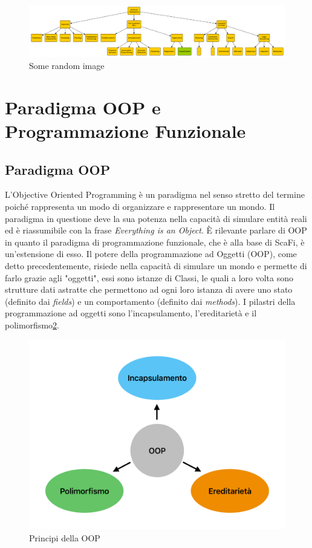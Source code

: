 \documentclass[12pt,a4paper,openright,twoside]{book}
\begin{document}

\begin{figure}
    \centering
    \includegraphics[width=.8\linewidth]{figures/random-image.pdf}
    \caption{Some random image}
    \label{fig:random-image}
\end{figure}

\section{Paradigma OOP e Programmazione Funzionale}

\subsection{Paradigma OOP}

L'Objective Oriented Programming è un paradigma nel senso stretto del termine poiché rappresenta un modo di organizzare e rappresentare un mondo. 
Il paradigma in questione deve la sua potenza nella capacità di simulare entità reali ed è riassumibile con la frase \textit{Everything is an Object}. 
È rilevante parlare di OOP in quanto il paradigma di programmazione funzionale, che è alla base di ScaFi, è un'estensione di esso. 
Il potere della programmazione ad Oggetti (OOP), come detto precedentemente, risiede nella capacità di simulare un mondo e permette di farlo grazie agli "oggetti", essi sono istanze di Classi, le quali a loro volta sono strutture dati astratte che permettono ad ogni loro istanza di avere uno stato (definito dai \textit{fields}) e un comportamento (definito dai \textit{methods}).
I pilastri della programmazione ad oggetti sono l'incapsulamento, l'ereditarietà e il polimorfismo\cref{fig:OOP}.

\begin{figure}
    \centering
    \includegraphics[width=.6\linewidth]{figures/OOP.pdf}
    \caption{Principi della OOP}
    \label{fig:OOP}
\end{figure}
\end{document}
